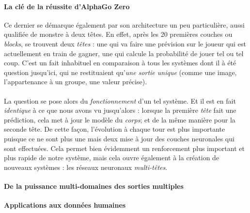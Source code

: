 \paragraph{La clé de la réussite d'AlphaGo Zero} Ce dernier se démarque également par son architecture un peu particulière,
aussi qualifiée de \guillemotleft monstre à deux têtes\guillemotright. \cite{AlphaGo3} En effet, après les 20 premières
couches ou \emph{blocks}, se trouvent deux \emph{têtes} : une qui va faire une prévision sur le joueur qui est actuellement
en train de gagner, une qui calcule la probabilité de jouer tel ou tel coup. C'est un fait inhabituel en comparaison à tous
les systèmes dont il à été question jusqu'ici, qui ne restituaient qu'\emph{une sortie unique} (comme une image, l'appartenance
à un groupe, une valeur précise).

\paragraph{} La question se pose alors du \emph{fonctionnement} d'un tel système. Et il est en fait \emph{identique}
à ce que nous avons vu jusqu'alors : lorsque la première \emph{tête} fait une prédiction, cela met à jour le modèle
du \emph{corps}; et de la même manière pour la seconde tête. De cette façon, l'évolution à chaque tour est plus importante
puisque ce ne sont plus une mais deux mise à jour des couches neuronales qui sont effectuées. Cela permet bien évidemment
un renforcement plus important et plus rapide de notre système, mais cela ouvre également à la création de nouveaux systèmes :
les réseaux neuronaux \emph{multi-têtes}.

\paragraph{De la puissance multi-domaines des sorties multiples}

\paragraph{Applications aux données humaines}

